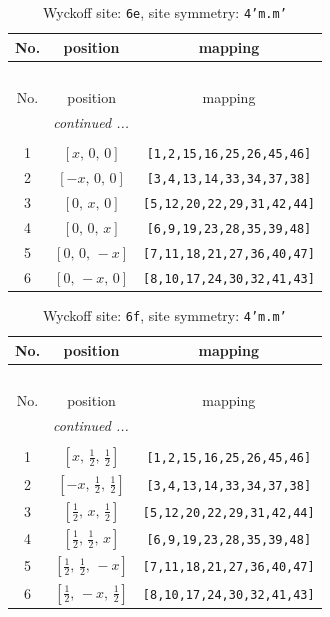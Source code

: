 \documentclass[fleqn,8pt]{jsarticle}
\begin{document}
\renewcommand{\arraystretch}{1.2}
\begin{longtable}{ccc}
\caption{Wyckoff site: {\tt 6e}, site symmetry: {\tt 4'm.m'}}
 \\
 \hline \hline
No. & position & mapping \\ \hline \endfirsthead

\multicolumn{2}{l}{\tablename\ \thetable{}} \\
 \hline \hline
No. & position & mapping \\ \hline \endhead

 \hline \hline
\multicolumn{2}{r}{\footnotesize\it continued ...} \\ \endfoot

 \hline \hline
\multicolumn{2}{r}{} \\ \endlastfoot

1 & $\left[ x,\, 0,\, 0 \right]$ & {\tt [1,2,15,16,25,26,45,46]} \\ \hline
2 & $\left[ - x,\, 0,\, 0 \right]$ & {\tt [3,4,13,14,33,34,37,38]} \\ \hline
3 & $\left[ 0,\, x,\, 0 \right]$ & {\tt [5,12,20,22,29,31,42,44]} \\ \hline
4 & $\left[ 0,\, 0,\, x \right]$ & {\tt [6,9,19,23,28,35,39,48]} \\ \hline
5 & $\left[ 0,\, 0,\, - x \right]$ & {\tt [7,11,18,21,27,36,40,47]} \\ \hline
6 & $\left[ 0,\, - x,\, 0 \right]$ & {\tt [8,10,17,24,30,32,41,43]} \\
\end{longtable}
\renewcommand{\arraystretch}{1.2}
\begin{longtable}{ccc}
\caption{Wyckoff site: {\tt 6f}, site symmetry: {\tt 4'm.m'}}
 \\
 \hline \hline
No. & position & mapping \\ \hline \endfirsthead

\multicolumn{2}{l}{\tablename\ \thetable{}} \\
 \hline \hline
No. & position & mapping \\ \hline \endhead

 \hline \hline
\multicolumn{2}{r}{\footnotesize\it continued ...} \\ \endfoot

 \hline \hline
\multicolumn{2}{r}{} \\ \endlastfoot

1 & $\left[ x,\, \frac{1}{2},\, \frac{1}{2} \right]$ & {\tt [1,2,15,16,25,26,45,46]} \\ \hline
2 & $\left[ - x,\, \frac{1}{2},\, \frac{1}{2} \right]$ & {\tt [3,4,13,14,33,34,37,38]} \\ \hline
3 & $\left[ \frac{1}{2},\, x,\, \frac{1}{2} \right]$ & {\tt [5,12,20,22,29,31,42,44]} \\ \hline
4 & $\left[ \frac{1}{2},\, \frac{1}{2},\, x \right]$ & {\tt [6,9,19,23,28,35,39,48]} \\ \hline
5 & $\left[ \frac{1}{2},\, \frac{1}{2},\, - x \right]$ & {\tt [7,11,18,21,27,36,40,47]} \\ \hline
6 & $\left[ \frac{1}{2},\, - x,\, \frac{1}{2} \right]$ & {\tt [8,10,17,24,30,32,41,43]} \\
\end{longtable}
\end{document}
